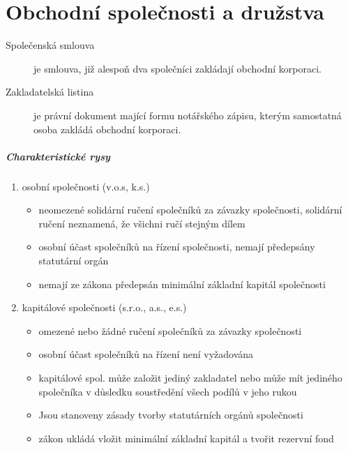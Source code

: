 \chapter{Obchodní společnosti a družstva}

\begin{description}
    \item[Společenská smlouva] je smlouva, již alespoň dva společníci zakládají obchodní korporaci.
    \item[Zakladatelská listina] je právní dokument mající formu notářského zápisu, kterým samostatná osoba zakládá obchodní korporaci.
\end{description}

\paragraph*{Charakteristické rysy}
\begin{enumerate}
    \item osobní společnosti (v.o.s, k.s.)
        \begin{itemize}
            \item neomezené solidární ručení společníků za závazky společnosti, solidární ručení neznamená, že všichni ručí stejným dílem
            \item osobní účast společníků na řízení společnosti, nemají předepsány statutární orgán
            \item nemají ze zákona předepsán minimální základní kapitál společnosti
        \end{itemize}
    \item kapitálové společnosti (s.r.o., a.s., e.s.)
        \begin{itemize}
            \item omezené nebo žádné ručení společníků za závazky společnosti
            \item osobní účast společníků na řízení není vyžadována
            \item kapitálové spol. může založit jediný zakladatel nebo může mít jediného společníka v důsledku soustředění všech podílů v jeho rukou
            \item Jsou stanoveny zásady tvorby statutárních orgánů společnosti
            \item zákon ukládá vložit minimální základní kapitál a tvořit rezervní fond
        \end{itemize}
\end{enumerate}

